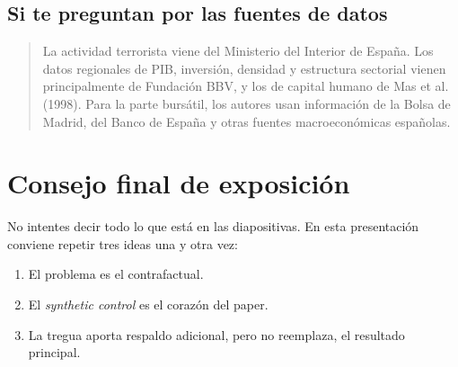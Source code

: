 \documentclass[11pt]{article}
\begin{document}
\subsection*{Si te preguntan por las fuentes de datos}

\begin{quote}
La actividad terrorista viene del Ministerio del Interior de España. Los datos regionales de PIB, inversión, densidad y estructura sectorial vienen principalmente de Fundación BBV, y los de capital humano de Mas et al. (1998). Para la parte bursátil, los autores usan información de la Bolsa de Madrid, del Banco de España y otras fuentes macroeconómicas españolas.
\end{quote}

\section*{Consejo final de exposición}

No intentes decir todo lo que está en las diapositivas. En esta presentación conviene repetir tres ideas una y otra vez:

\begin{enumerate}
    \item El problema es el contrafactual.
    \item El \emph{synthetic control} es el corazón del paper.
    \item La tregua aporta respaldo adicional, pero no reemplaza, el resultado principal.
\end{enumerate}
\end{document}
